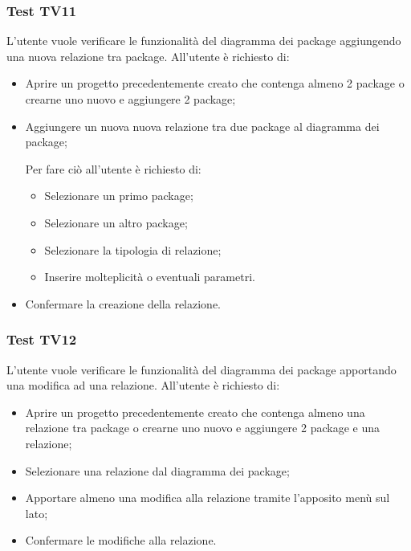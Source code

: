 \documentclass[../PianoDiQualifica.tex]{subfiles}
\begin{document}
	\subsubsection{Test TV11} 
	L'utente vuole verificare le funzionalità del diagramma dei package aggiungendo una nuova relazione tra package. 
	All'utente è richiesto di: 
	\begin{itemize} 
		\item Aprire un progetto precedentemente creato che contenga almeno 2 package o crearne uno nuovo e aggiungere 2 package; 
		\item Aggiungere un nuova nuova relazione tra due package al diagramma dei package; 
		
		Per fare ciò all'utente è richiesto di: 
		\begin{itemize}  
			\item Selezionare un primo package; 
			\item Selezionare un altro package; 
			\item Selezionare la tipologia di relazione; 
			\item Inserire molteplicità o eventuali parametri. 
		\end{itemize} 
		\item Confermare la creazione della relazione. 
	\end{itemize} 
	
	\subsubsection{Test TV12} %
	L'utente vuole verificare le funzionalità del diagramma dei package apportando una modifica ad una relazione. 
	All'utente è richiesto di: 
	\begin{itemize} 
		\item Aprire un progetto precedentemente creato che contenga almeno una relazione tra package o crearne uno nuovo e aggiungere 2 package e una relazione; 
		\item Selezionare una relazione dal diagramma dei package; 
		\item Apportare almeno una modifica alla relazione tramite l'apposito menù sul lato; 
		\item Confermare le modifiche alla relazione. 
	\end{itemize} %
	
	
\end{document}
